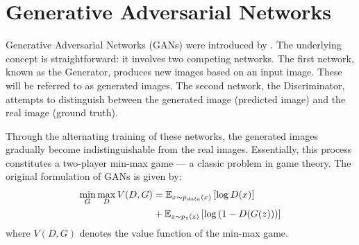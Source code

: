 \section{Generative Adversarial Networks}
Generative Adversarial Networks (GANs) were introduced by \citep{goodfellow2014generative}. The underlying concept is straightforward: it involves two competing networks. The first network, known as the Generator, produces new images based on an input image. These will be referred to as generated images. The second network, the Discriminator, attempts to distinguish between the generated image (predicted image) and the real image (ground truth).

Through the alternating training of these networks, the generated images gradually become indistinguishable from the real images. Essentially, this process constitutes a two-player min-max game --- a classic problem in game theory. The original formulation of GANs is given by:
\begin{equation}
	\centering
	\begin{aligned}
		\min_{G} \max_{D} V(D, G) &= \mathbb{E}_{x \sim p_{data}(x)} \left[ \log D(x) \right] \\
		&+ \mathbb{E}_{z \sim p_{z}(z)} \left[ \log \left( 1-D(G(z)) \right) \right]
	\end{aligned}
	\label{eq:Basic_GAN}
\end{equation}
where $V(D, G)$ denotes the value function of the min-max game.

